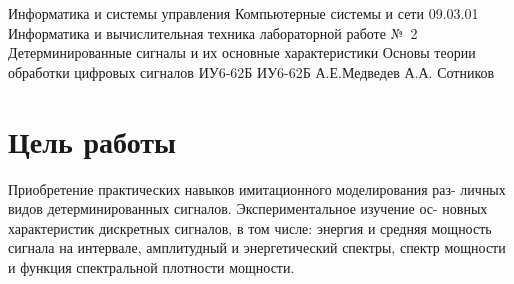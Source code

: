 \documentclass{bmstu}
\begin{document}



\makereporttitle
    {Информатика и системы управления} %
    {Компьютерные системы и сети} %
    {09.03.01 Информатика и вычислительная техника} %
    {лабораторной работе №~2} %
    {Детерминированные сигналы и их основные характеристики} %
    {Основы теории обработки цифровых сигналов} %
    {} %
    {ИУ6-62Б} %
    {
    	{ИУ6-62Б}
    	{А.Е.Медведев} %
    	{А.А. Сотников} %
    } 
    
\section*{Цель работы}
Приобретение практических навыков имитационного моделирования раз-
личных видов детерминированных сигналов. Экспериментальное изучение ос-
новных характеристик дискретных сигналов, в том числе: энергия и средняя
мощность сигнала на интервале, амплитудный и энергетический спектры, спектр
мощности и функция спектральной плотности мощности.
\end{document}

